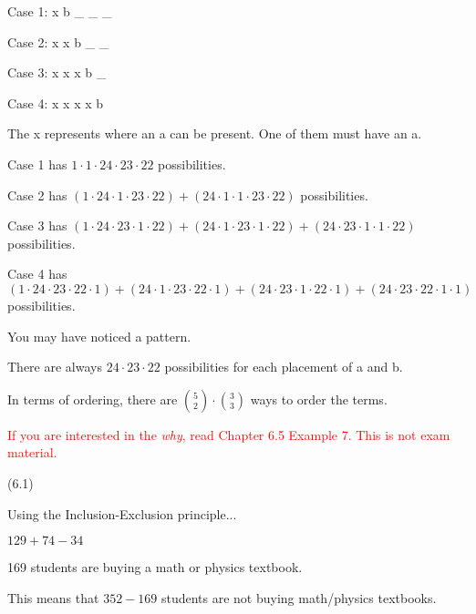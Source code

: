 \documentclass{exam}
\begin{document}
\begin{questions}
\begin{center}
Case 1: x b \_ \_ \_

Case 2: x x b \_ \_

Case 3: x x x b \_

Case 4: x x x x b

The x represents where an a can be present. One of them must have an a.

Case 1 has \(1 \cdot 1 \cdot 24 \cdot 23 \cdot 22\) possibilities.

Case 2 has \((1 \cdot 24 \cdot 1 \cdot 23 \cdot 22) + (24 \cdot 1 \cdot 1 \cdot 23 \cdot 22)\) possibilities.

Case 3 has \((1 \cdot 24 \cdot 23 \cdot 1 \cdot 22) + (24 \cdot 1 \cdot 23 \cdot 1 \cdot 22) + (24 \cdot 23 \cdot 1 \cdot 1 \cdot 22)\) possibilities. 

Case 4 has \((1 \cdot 24 \cdot 23 \cdot 22 \cdot 1) + (24 \cdot 1 \cdot 23 \cdot 22 \cdot 1) + (24 \cdot 23 \cdot 1 \cdot 22 \cdot 1) + (24 \cdot 23 \cdot 22 \cdot 1 \cdot 1)\) possibilities. 

You may have noticed a pattern.

There are always \(24 \cdot 23 \cdot 22\) possibilities for each placement of a and b.

In terms of ordering, there are \({5 \choose 2} \cdot {3 \choose 3}\) ways to order the terms.

\textcolor{red}{If you are interested in the \textit{why}, read Chapter 6.5 Example 7. This is not exam material.}

\end{center}

 (6.1)

\begin{center}

Using the Inclusion-Exclusion principle...

\(129 + 74 - 34\)

169 students are buying a math or physics textbook.

This means that \(352 - 169\) students are not buying math/physics textbooks.

\end{center}



\end{questions}
\end{document}
